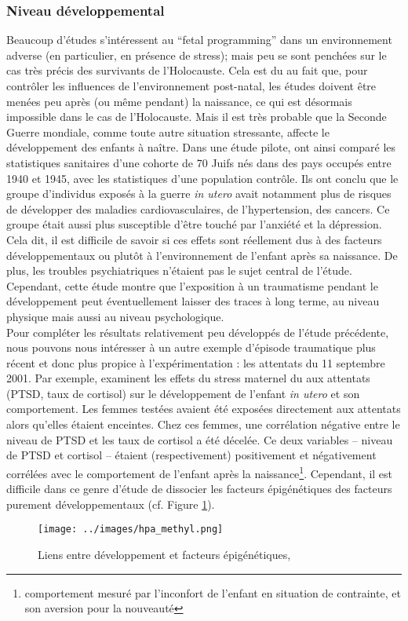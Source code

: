 \documentclass[french]{article}
\begin{document}
		\subsubsection{Niveau développemental}
			Beaucoup d'études s'intéressent au ``fetal programming'' dans un environnement adverse (en particulier, en présence de stress); mais peu se sont penchées sur le cas très précis des survivants de l'Holocauste. Cela est du au fait que, pour contrôler les influences de l'environnement post-natal, les études doivent être menées peu après (ou même pendant) la naissance, ce qui est désormais impossible dans le cas de l'Holocauste. Mais il est très probable que la Seconde Guerre mondiale, comme toute autre situation stressante, affecte le développement des enfants à naître. Dans une étude pilote, \cite{bercovich2014} ont ainsi comparé les statistiques sanitaires d'une cohorte de 70 Juifs nés dans des pays occupés entre 1940 et 1945, avec les statistiques d'une population contrôle. Ils ont conclu que le groupe d'individus exposés à la guerre \textit{in utero} avait notamment plus de risques de développer des maladies cardiovasculaires, de l'hypertension, des cancers. Ce groupe était aussi plus susceptible d'être touché par l'anxiété et la dépression. Cela dit, il est difficile de savoir si ces effets sont réellement dus à des facteurs développementaux ou plutôt à l'environnement de l'enfant après sa naissance. De plus, les troubles psychiatriques n'étaient pas le sujet central de l'étude.
			Cependant, cette étude montre que l'exposition à un traumatisme pendant le développement peut éventuellement laisser des traces à long terme, au niveau physique mais aussi au niveau psychologique.\\
			
			Pour compléter les résultats relativement peu développés de l'étude précédente, nous pouvons nous intéresser à un autre exemple d'épisode traumatique plus récent et donc plus propice à l'expérimentation : les attentats du 11 septembre 2001. Par exemple, \cite{brand2006} examinent les effets du stress maternel du aux attentats (PTSD, taux de cortisol) sur le développement de l'enfant \textit{in utero} et son comportement. Les femmes testées avaient été exposées directement aux attentats alors qu'elles étaient enceintes. Chez ces femmes, une corrélation négative entre le niveau de PTSD et les taux de cortisol a été décelée. Ce deux variables -- niveau de PTSD et cortisol -- étaient (respectivement) positivement et négativement corrélées avec le comportement de l'enfant après la naissance\footnote{comportement mesuré par l'inconfort de l'enfant en situation de contrainte, et son aversion pour la nouveauté}. Cependant, il est difficile dans ce genre d'étude de dissocier les facteurs épigénétiques des facteurs purement développementaux (cf. Figure \ref{fig:dev_gen}).
			\begin{figure}[H]
				\centering
				\texttt{[image: ../images/hpa\_methyl.png]}
				\caption{Liens entre développement et facteurs épigénétiques, \cite{vaiserman2017}}
				\label{fig:dev_gen}
			\end{figure}
	
\end{document}
